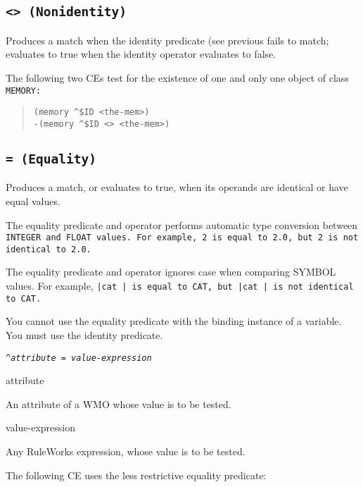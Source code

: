 \subsection{\tt{<>} (Nonidentity)}

Produces a match when the identity predicate (see previous fails to
match; evaluates to true when the identity operator evaluates to
false.

\Example

The following two CEs test for the existence of one and only
one object of class \tt{MEMORY}:

\begin{quote}
\begin{verbatim}
(memory ^$ID <the-mem>)
-(memory ^$ID <> <the-mem>)
\end{verbatim}
\end{quote}

\subsection{\tt= (Equality)}

Produces a match, or evaluates to true, when its operands are
identical or have equal values.

The equality predicate and operator performs automatic type conversion
between \tt{INTEGER} and \tt{FLOAT} values. For example, 2 is equal to 2.0, but
2 is not identical to 2.0.

The equality predicate and operator ignores case when comparing SYMBOL
values. For example, \tt{|cat |} is equal to \tt{CAT}, but \tt{|cat |}
is not identical to \tt{CAT}.

You cannot use the equality predicate with the binding instance of a
variable. You must use the identity predicate.

\Format

\tt{\^}\it{attribute} \tt= \it{value-expression}

\begin{operands}
\item[\ct attribute]

  An attribute of a WMO whose value is to be tested.

\item[value-expression]

  Any RuleWorks expression, whose value is to be tested.
\end{operands}

\Example

The following CE uses the less restrictive equality predicate:


